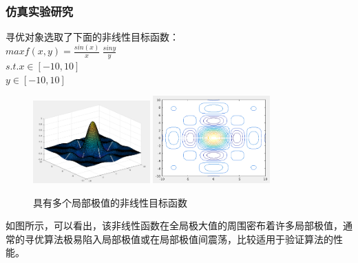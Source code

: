 \begin{frame}
	\frametitle{仿真实验研究}
寻优对象选取了下面的非线性目标函数：\\
	\indent\indent $max f(x,y)=\tfrac {sin(x)}{x}\ \frac{sin{y}}{y}$\\
	\indent\indent $s.t. x\in [-10,10]$\\
	\indent\indent $y\in [-10,10]$\\
	\begin{figure}
		\includegraphics[width=0.4\textwidth]{pic/fish9.png}
		\includegraphics[width=0.4\textwidth]{pic/fish10.png}
		\caption{具有多个局部极值的非线性目标函数}
	\end{figure}
如图所示，可以看出，该非线性函数在全局极大值的周围密布着许多局部极值，通常的寻优算法极易陷入局部极值或在局部极值间震荡，比较适用于验证算法的性能。
\end{frame}

